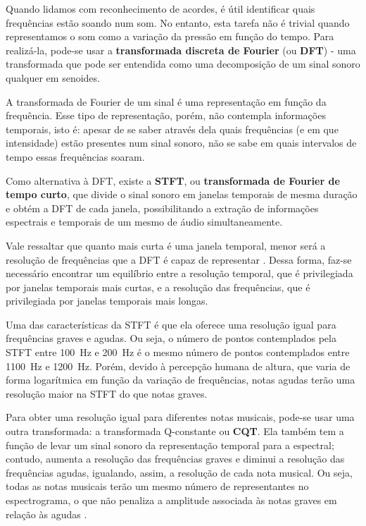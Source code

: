     Quando lidamos com reconhecimento de acordes, é útil identificar quais frequências estão soando num som. No entanto, esta tarefa não é trivial quando representamos o som como a variação da pressão em função do tempo. Para realizá-la, pode-se usar a \textbf{transformada discreta de Fourier} (ou \textbf{DFT}) - uma transformada que pode ser entendida como uma decomposição de um sinal sonoro qualquer em senoides.

    A transformada de Fourier de um sinal é uma representação em função da frequência. Esse tipo de representação, porém, não contempla informações temporais, isto é: apesar de se saber através dela quais frequências (e em que intensidade) estão presentes num sinal sonoro, não se sabe em quais intervalos de tempo essas frequências soaram.
    
    Como alternativa à DFT, existe a \textbf{STFT}, ou \textbf{transformada de Fourier de tempo curto}, que divide o sinal sonoro em janelas temporais de mesma duração e obtém a DFT de cada janela, possibilitando a extração de informações espectrais e temporais de um mesmo de áudio simultaneamente.
    
    Vale ressaltar que quanto mais curta é uma janela temporal, menor será a resolução de frequências que a DFT é capaz de representar  \citep[ver][seções 2.1 a 2.3]{dsp}. Dessa forma, faz-se necessário encontrar um equilíbrio entre a resolução temporal, que é privilegiada por janelas temporais mais curtas, e a resolução das frequências, que é privilegiada por janelas temporais mais longas.
    
    Uma das características da STFT é que ela oferece uma resolução igual para frequências graves e agudas. Ou seja, o número de pontos contemplados pela STFT entre 100~Hz e 200~Hz é o mesmo número de pontos contemplados entre 1100~Hz e 1200~Hz. Porém, devido à percepção humana de altura, que varia de forma logarítmica em função da variação de frequências, notas agudas terão uma resolução maior na STFT do que notas graves.
    
    Para obter uma resolução igual para diferentes notas musicais, pode-se usar uma outra transformada: a transformada Q-constante ou \textbf{CQT}. Ela também tem a função de levar um sinal sonoro da representação temporal para a espectral; contudo, aumenta a resolução das frequências graves e diminui a resolução das frequências agudas, igualando, assim, a resolução de cada nota musical. Ou seja, todas as notas musicais terão um mesmo número de representantes no espectrograma, o que não penaliza a amplitude associada às notas graves em relação às agudas \citep[ver][seção 3.4.1]{muller}.


